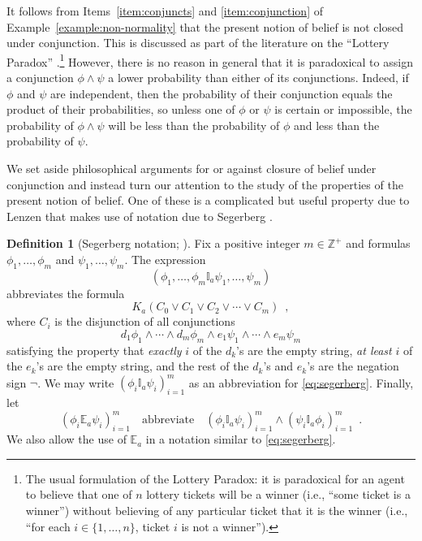 \documentclass[12pt]{article}
\newcommand{\XXXcomment}[1]{}
\newcommand{\XXXcomment}[1]{\marginpar{\color{blue}{\footnotesize #1}}}
\theoremstyle{definition}
\newtheorem{definition}[theorem]{Definition}
\newcommand{\Int}{\mathbb{Z}}  %
\begin{document}
It follows from Items~\ref{item:conjuncts} and \ref{item:conjunction}
of Example~\ref{example:non-normality} that the present notion of
belief is not closed under conjunction.  This is discussed as part of
the literature on the ``Lottery Paradox''
\cite{Kyburg1961:patlorb}.\footnote{The usual formulation of the
  Lottery Paradox: it is paradoxical for an agent to believe that one
  of $n$ lottery tickets will be a winner (i.e., ``some ticket is a
  winner'') without believing of any particular ticket that it is the
  winner (i.e., ``for each $i\in\{1,\dots,n\}$, ticket $i$ is not a
  winner'').}  However, there is no reason in general that it is
paradoxical to assign a conjunction $\phi \land \psi$ a lower
probability than either of its conjunctions.  Indeed, if $\phi$ and
$\psi$ are independent, then the probability of their conjunction
equals the product of their probabilities, so unless one of $\phi$ or
$\psi$ is certain or impossible, the probability of $\phi \land \psi$
will be less than the probability of $\phi$ and less than the
probability of $\psi$.

We set aside philosophical arguments for or against closure of belief
under conjunction and instead turn our attention to the study of the
properties of the present notion of belief.  One of these is a
complicated but useful property due to Lenzen \cite{Lenzen2003:kbasp}
that makes use of notation due to Segerberg
\cite{Segerberg1971:qpiams}.

\XXXcomment{BR: added subscripted $i$'s to Segerberg and Lenzen
  property notation throughout.  Hopefully none missed?}

\begin{definition}[Segerberg notation; \cite{Segerberg1971:qpiams}]
  \label{definition:segerberg-notation}
  Fix a positive integer $m\in\Int^+$ and formulas
  $\phi_1,\dots,\phi_m$ and $\psi_1,\dots,\psi_m$.  The expression
  \begin{equation}
    (\phi_1,\dots,\phi_m\mathbb{I}_a\psi_1,\dots,\psi_m)
    \label{eq:segerberg}
  \end{equation}
  abbreviates the formula
  \[
  K_a(C_0\lor C_1\lor C_2 \lor \cdots \lor C_m)\enspace,
  \]
  where $C_i$ is the disjunction of all conjunctions
  \[
  d_1\phi_1\land\cdots\land d_m\phi_m \land
  e_1\psi_1\land\cdots\land e_m\psi_m
  \]
  satisfying the property that \emph{exactly} $i$ of the $d_k$'s are the
  empty string, \emph{at least} $i$ of the $e_k$'s are the empty string, and
  the rest of the $d_k$'s and $e_k$'s are the negation sign $\lnot$.
  We may write $(\phi_i\mathbb{I}_a\psi_i)_{i=1}^m$ as an
  abbreviation for \eqref{eq:segerberg}.  Finally, let
  \[
  (\phi_i\mathbb{E}_a\psi_i)_{i=1}^m
  \quad\text{abbreviate}\quad
  (\phi_i\mathbb{I}_a\psi_i)_{i=1}^m\land(\psi_i\mathbb{I}_a\phi_i)_{i=1}^m
  \enspace.
  \]
  We also allow the use of $\mathbb{E}_a$ in a notation similar to 
  \eqref{eq:segerberg}.
\end{definition}
\end{document}
